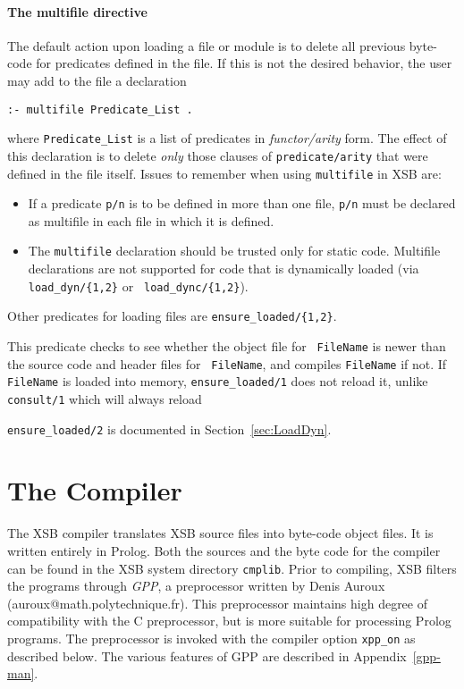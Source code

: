 \paragraph*{The multifile directive}
The default action upon loading a file or module is to delete all
previous byte-code for predicates defined in the file.  If this is not
the desired behavior, the user may add to the file a declaration
\begin{center}
{\tt :- multifile Predicate\_List .} \\
\end{center}
where {\tt Predicate\_List} is a list of predicates in {\em
functor/arity\/} form.  The effect of this declaration is to delete
{\em only\/} those clauses of {\tt predicate/arity} that were defined
in the file itself.  Issues to remember when using {\tt multifile} in
XSB \version{} are:
%
\begin{itemize}
\item If a predicate {\tt p/n} is to be defined in more than one file,
{\tt p/n} must be declared as multifile in each file in which it is
defined. 
%
\item The {\tt multifile} declaration should be trusted only for
static code.  Multifile declarations are not supported for code that
is dynamically loaded (via {\tt load\_dyn/\{1,2\}} or {\tt
load\_dync/\{1,2\}}).
%
\end{itemize}

Other predicates for loading files are {\tt ensure\_loaded/\{1,2\}}.  

\begin{description}
%
This predicate checks to see whether the object file for {\tt
FileName} is newer than the source code and header files for {\tt
FileName}, and compiles {\tt FileName} if not.  If {\tt FileName} is
loaded into memory, {\tt ensure\_loaded/1} does not reload it, unlike
{\tt consult/1} which will always reload
\end{description}
% 
{\tt ensure\_loaded/2} is documented in Section~\ref{sec:LoadDyn}.

\section{The Compiler} \label{the_compiler} 

The XSB compiler translates XSB source files into
byte-code object files.  It is written entirely in Prolog.
Both the sources and the byte code
for the compiler can be found in the XSB system directory
{\tt cmplib}.
%
Prior to compiling, XSB filters the programs through \emph{GPP}, a 
preprocessor written by Denis Auroux (auroux@math.polytechnique.fr).
This preprocessor maintains high degree of compatibility with the C
preprocessor, but is more suitable for processing Prolog programs.
The preprocessor is invoked with the compiler option \verb|xpp_on|
as described below. The various features of GPP are described in
Appendix~\ref{gpp-man}.

